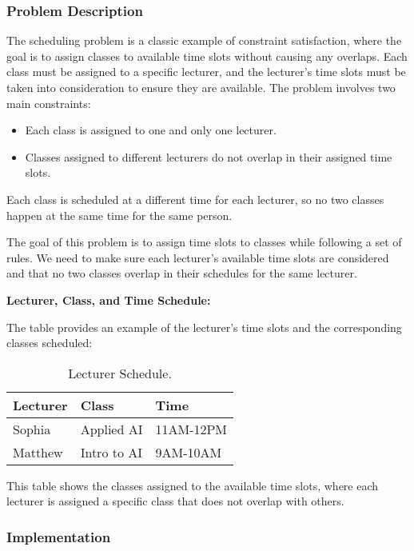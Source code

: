 \documentclass[12pt]{article}
\begin{document}
\subsubsection{Problem Description}

The scheduling problem is a classic example of constraint satisfaction, where the goal is to assign classes to available time slots without causing any overlaps. Each class must be assigned to a specific lecturer, and the lecturer's time slots must be taken into consideration to ensure they are available. The problem involves two main constraints:

\begin{itemize}
    \item Each class is assigned to one and only one lecturer.
    \item Classes assigned to different lecturers do not overlap in their assigned time slots.
\end{itemize}Each class is scheduled at a different time for each lecturer, so no two classes happen at the same time for the same person.

The goal of this problem is to assign time slots to classes while following a set of rules. We need to make sure each lecturer's available time slots are considered and that no two classes overlap in their schedules for the same lecturer.

\textbf{Lecturer, Class, and Time Schedule:}

The table provides an example of the lecturer's time slots and the corresponding classes scheduled:

\begin{table}[h!]
    \centering
    \begin{tabular}{|l|l|l|}
        \hline
        \textbf{Lecturer} & \textbf{Class} & \textbf{Time} \\
        \hline
        Sophia & Applied AI & 11AM-12PM \\
        Matthew & Intro to AI & 9AM-10AM \\
        \hline
    \end{tabular}
    \caption{Lecturer Schedule.}
    \label{tab:schedule}
\end{table}

This table shows the classes assigned to the available time slots, where each lecturer is assigned a specific class that does not overlap with others.

\subsubsection{Implementation}
\end{document}
